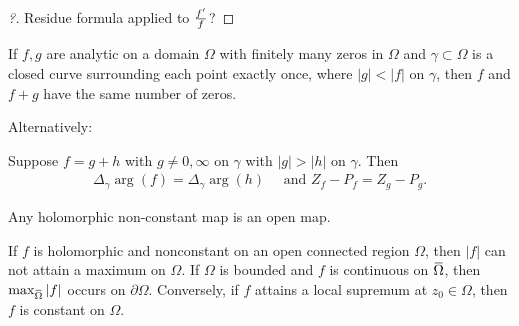\begin{proof}[?]

Residue formula applied to \(f'\over f\)?

\end{proof}

\begin{corollary}\label{Rouche}

If \(f, g\) are analytic on a domain \(\Omega\) with finitely many zeros
in \(\Omega\) and \(\gamma \subset \Omega\) is a closed curve
surrounding each point exactly once, where
\({\left\lvert {g} \right\rvert} < {\left\lvert {f} \right\rvert}\) on
\(\gamma\), then \(f\) and \(f+g\) have the same number of zeros.

Alternatively:

Suppose \(f = g + h\) with \(g \neq 0, \infty\) on \(\gamma\) with
\({\left\lvert {g} \right\rvert} > {\left\lvert {h} \right\rvert}\) on
\(\gamma\). Then
\begin{align*}\Delta_\gamma \arg(f) = \Delta_\gamma \arg(h)\quad\text{ and } Z_f - P_f = Z_g - P_g.\end{align*}

\end{corollary}


\begin{corollary}

Any holomorphic non-constant map is an open map.

\end{corollary}


\begin{corollary}\label{MaximumModulus}

If \(f\) is holomorphic and nonconstant on an open connected region
\(\Omega\), then \({\left\lvert {f} \right\rvert}\) can not attain a
maximum on \(\Omega\). If \(\Omega\) is bounded and \(f\) is continuous
on
\(\mkern 1.5mu\overline{\mkern-1.5mu\Omega\mkern-1.5mu}\mkern 1.5mu\),
then
\(\max_{\mkern 1.5mu\overline{\mkern-1.5mu\Omega\mkern-1.5mu}\mkern 1.5mu} {\left\lvert {f} \right\rvert}\)
occurs on \({{\partial}}\Omega\). Conversely, if \(f\) attains a local
supremum at \(z_0 \in \Omega\), then \(f\) is constant on \(\Omega\).

\end{corollary}


